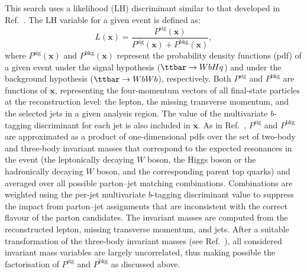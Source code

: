 This search uses a likelihood (LH) discriminant similar to that developed in Ref.~\cite{Aad:2015pja}.
The LH variable for a given event is defined as:
\begin{equation*}
L(\mathbf{x}) = \frac{P^\textrm{sig}(\mathbf{x}) }{P^\textrm{sig}(\mathbf{x}) +P^\textrm{bkg}(\mathbf{x}) },
\label{eq:D}
\end{equation*}
where $P^\textrm{sig}(\mathbf{x}) $ and $P^\textrm{bkg}(\mathbf{x})$ represent the probability density functions (pdf) of a given event under
the signal hypothesis ($\ttbar \to WbHq$) and under the background hypothesis ($\ttbar \to WbWb$), respectively.
%
Both $P^\textrm{sig}$ and $P^\textrm{bkg}$ are functions of $\mathbf{x}$, representing the four-momentum vectors of all final-state particles at the reconstruction level:
the lepton, the missing transverse momentum, and the selected jets in a given analysis region.
The value of the multivariate $b$-tagging discriminant for each jet is also included in $\mathbf{x}$.
As in Ref.~\cite{Aad:2015pja}, $P^\textrm{sig}$ and $P^\textrm{bkg}$ are approximated as a product of one-dimensional pdfs 
over the set of two-body and three-body invariant masses that correspond to the expected resonances in the event (the leptonically decaying $W$ boson, 
the Higgs boson or the hadronically decaying $W$ boson, and the corresponding parent top quarks) and averaged over all possible parton--jet matching combinations. 
%
Combinations are weighted using the per-jet multivariate $b$-tagging discriminant value to suppress the impact from 
parton--jet assignments that are inconsistent with the correct flavour of the parton candidates.
The invariant masses are computed from the reconstructed lepton, missing transverse momentum, and jets. After a suitable transformation of the three-body invariant masses 
(see Ref.~\cite{Aad:2015pja}), all considered invariant mass variables are largely uncorrelated, thus making possible the factorisation of $P^\textrm{sig}$ and $P^\textrm{bkg}$
as discussed above.

